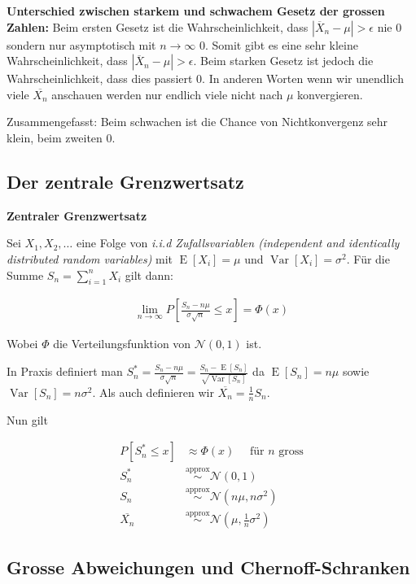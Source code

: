 \documentclass[25pt]{sciposter}
\newcommand{\Var}{\operatorname{Var}}
\newcommand{\E}{\operatorname{E}}
\newenvironment{method}[1]{\begin{mdframed}[backgroundcolor=blue!10,innertopmargin=15pt, innerbottommargin=15pt,nobreak=true]
		\textbf{#1 }
	}
	{ 
	\end{mdframed}
}
\begin{document}
\begin{multicols}{3}
\textbf{Unterschied zwischen starkem und schwachem Gesetz der grossen Zahlen:} Beim ersten Gesetz ist die Wahrscheinlichkeit, dass $|\overline{X}_n - \mu|> \epsilon$ nie 0 sondern nur asymptotisch mit $n \to \infty$ 0. Somit gibt es eine sehr kleine Wahrscheinlichkeit, dass $|\overline{X}_n - \mu| > \epsilon$. Beim starken Gesetz ist jedoch die Wahrscheinlichkeit, dass dies passiert 0. In anderen Worten wenn wir unendlich viele $\overline{X_n}$ anschauen werden nur endlich viele nicht nach $\mu$ konvergieren.

Zusammengefasst: Beim schwachen ist die Chance von Nichtkonvergenz sehr klein, beim zweiten 0.

\subsection*{Der zentrale Grenzwertsatz}


\begin{method}{Zentraler Grenzwertsatz}
	Sei $X_1,X_2,\ldots$ eine Folge von \textit{i.i.d Zufallsvariablen (independent and identically distributed random variables)} mit $\E[X_i] = \mu$ und $\Var[X_i] = \sigma^2$. Für die Summe $S_n = \sum_{i=1}^{n} X_i$ gilt dann:
	
	\begin{align*}
		\lim\limits_{n \to \infty} P\left[ \frac{S_n - n\mu}{\sigma \sqrt{n}} \leq x\right] = \Phi(x)
	\end{align*}

	Wobei $\Phi$ die Verteilungsfunktion von $\mathcal{N}(0,1)$ ist.	
\end{method}

In Praxis definiert man $S_n^* = \frac{S_n- n\mu}{\sigma \sqrt{n}} = \frac{S_n-\E[S_n]}{\sqrt{\Var[S_n]}}$ da $\E[S_n] = n\mu$ sowie $\Var[S_n] = n\sigma^2$. Als auch definieren wir $\overline{X_n} = \frac{1}{n}S_n$.

Nun gilt

\begin{align*}
	P[S_n^*\leq x] &\approx \Phi(x) \quad \text{ für $n$ gross}\\
	S_n^* &\stackrel{\text{approx}}{\sim} \mathcal{N}(0,1)\\
	S_n &\stackrel{\text{approx}}{\sim} \mathcal{N}(n\mu, n\sigma^2)\\
	\overline{X_n} &\stackrel{\text{approx}}{\sim} \mathcal{N}(\mu, \frac{1}{n}\sigma^2)
\end{align*}

\subsection*{Grosse Abweichungen und Chernoff-Schranken}



\end{multicols}
\end{document}
